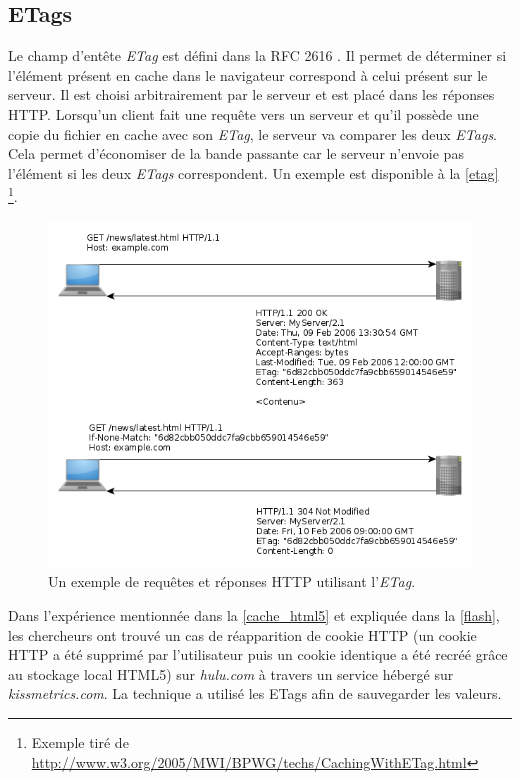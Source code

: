\subsection{ETags}
\label{cache_etags}
Le champ d'entête \textit{ETag} est défini dans la RFC 2616 \cite{IETF_RFC2616}. Il permet de déterminer si l'élément présent en cache dans le navigateur correspond à celui présent sur le serveur. Il est choisi arbitrairement par le serveur et est placé dans les réponses HTTP. Lorsqu'un client fait une requête vers un serveur et qu'il possède une copie du fichier en cache avec son \textit{ETag}, le serveur va comparer les deux \textit{ETags}. Cela permet d'économiser de la bande passante car le serveur n'envoie pas l'élément si les deux \textit{ETags} correspondent. Un exemple est disponible à la \autoref{etag} \footnote{Exemple tiré de \url{http://www.w3.org/2005/MWI/BPWG/techs/CachingWithETag.html}}.
\begin{figure}[h]
	\centering
	\includegraphics[scale=0.55]{figures/ETag.png}
	\caption{\label{etag}Un exemple de requêtes et réponses HTTP utilisant l'\textit{ETag}.}
\end{figure}
\newline

Dans l'expérience mentionnée dans la \autoref{cache_html5} et expliquée dans la \autoref{flash}, les chercheurs ont trouvé un cas de réapparition de cookie HTTP (un cookie HTTP a été supprimé par l'utilisateur puis un cookie identique a été recréé grâce au stockage local HTML5) sur \textit{hulu.com} à travers un service hébergé sur \textit{kissmetrics.com}. La technique a utilisé les ETags afin de sauvegarder les valeurs.
\newline

